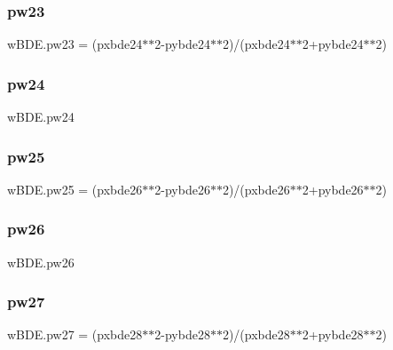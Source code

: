 \mbox{\label{namespacewBDE_a4cba7bb4892e8c8edb438de8e34ad3a8}} 
\subsubsection{\texorpdfstring{pw23}{pw23}}
{\footnotesize\ttfamily w\+B\+D\+E.\+pw23 = (pxbde24$\ast$$\ast$2-\/pybde24$\ast$$\ast$2)/(pxbde24$\ast$$\ast$2+pybde24$\ast$$\ast$2)}

\mbox{\label{namespacewBDE_a73cd5989b2e07df6745ce55b999b79c1}} 
\subsubsection{\texorpdfstring{pw24}{pw24}}
{\footnotesize\ttfamily w\+B\+D\+E.\+pw24}

\mbox{\label{namespacewBDE_a2d9e83e6b7b7e89d242260ac9afc328c}} 
\subsubsection{\texorpdfstring{pw25}{pw25}}
{\footnotesize\ttfamily w\+B\+D\+E.\+pw25 = (pxbde26$\ast$$\ast$2-\/pybde26$\ast$$\ast$2)/(pxbde26$\ast$$\ast$2+pybde26$\ast$$\ast$2)}

\mbox{\label{namespacewBDE_a9f31f7933adc96f4997375e32b7fd3fb}} 
\subsubsection{\texorpdfstring{pw26}{pw26}}
{\footnotesize\ttfamily w\+B\+D\+E.\+pw26}

\mbox{\label{namespacewBDE_a8255676c34cd4e8796aaa4e7dd21c8cf}} 
\subsubsection{\texorpdfstring{pw27}{pw27}}
{\footnotesize\ttfamily w\+B\+D\+E.\+pw27 = (pxbde28$\ast$$\ast$2-\/pybde28$\ast$$\ast$2)/(pxbde28$\ast$$\ast$2+pybde28$\ast$$\ast$2)}

